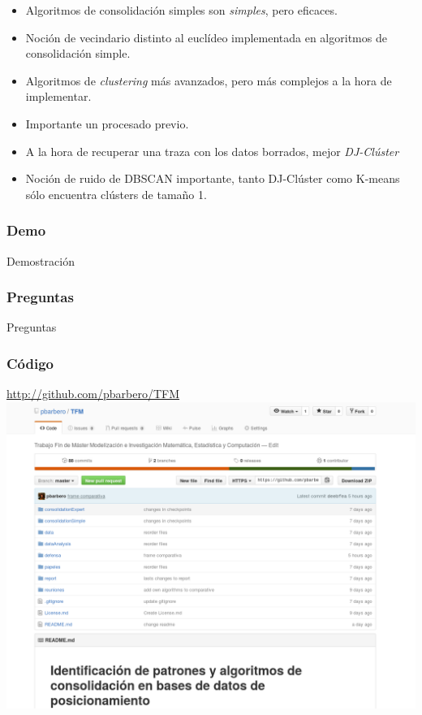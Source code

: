 \documentclass[10pt, spanish]{beamer}
\begin{document}
\begin{frame}[fragile]
\begin{itemize}[<+- | alert@+>]
	\item Algoritmos de consolidaci\'on simples son \textit{simples}, pero eficaces.
	\item Noci\'on de vecindario distinto al eucl\'ideo implementada en algoritmos de consolidaci\'on simple.
	\item Algoritmos de \textit{clustering} m\'as avanzados, pero m\'as complejos a la hora de implementar.
	\item Importante un procesado previo.
	\item A la hora de recuperar una traza con los datos borrados, mejor \textit{DJ-Cl\'uster}
	\item Noci\'on de ruido de DBSCAN importante, tanto DJ-Cl\'uster como K-means s\'olo encuentra cl\'usters de tama\~no 1.
\end{itemize}
\end{frame}


\begin{frame}[fragile]
\frametitle{Demo}
Demostraci\'on
\end{frame}

\begin{frame}[fragile]
\frametitle{Preguntas}
Preguntas
\end{frame}


\begin{frame}[fragile]
	\frametitle{C\'odigo}
	\begin{center}
		\href{http://github.com/pbarbero/TFM}{http://github.com/pbarbero/TFM}
		\includegraphics[scale=.3]{github.png}
	\end{center}
\end{frame}
\end{document}
